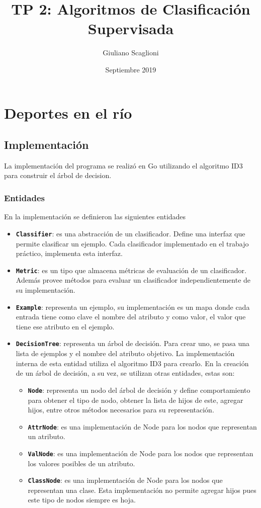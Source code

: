 \documentclass[a4paper]{article}
\title{TP 2: Algoritmos de Clasificación Supervisada}
\author{Giuliano Scaglioni}
\date{Septiembre 2019}
\newcommand{\bold}[1]{\textbf{\texttt{#1}}}
\begin{document}
\clearpage\maketitle
\thispagestyle{empty}

\newpage

\setcounter{page}{1}

\section{Deportes en el río}
  \subsection{Implementación}
  La implementación del programa se realizó en Go utilizando el algoritmo ID3 para construir el árbol de decision.

  \subsubsection{Entidades}
    En la implementación se definieron las siguientes entidades
    \begin{itemize}
      \item \bold{Classifier}: es una abstracción de un clasificador. Define una interfaz que permite clasificar un ejemplo. Cada clasificador implementado en el trabajo práctico, implementa esta interfaz.
      \item \bold{Metric}: es un tipo que almacena métricas de evaluación de un clasificador. Además provee métodos para evaluar un clasificador independientemente de su implementación.
      \item \bold{Example}: representa un ejemplo, su implementación es un mapa donde cada entrada tiene como clave el nombre del atributo y como valor, el valor que tiene ese atributo en el ejemplo.
      \item \bold{DecisionTree}: representa un árbol de decisión. Para crear uno, se pasa una lista de ejemplos y el nombre del atributo objetivo. La implementación interna de esta entidad utiliza el algoritmo ID3 para crearlo. En la creación de un árbol de decisión, a su vez, se utilizan otras entidades, estas son:
      \begin{itemize}
        \item \bold{Node}: representa un nodo del árbol de decisión y define comportamiento para obtener el tipo de nodo, obtener la lista de hijos de este, agregar hijos, entre otros métodos necesarios para su representación.
        \item \bold{AttrNode}: es una implementación de Node para los nodos que representan un atributo.
        \item \bold{ValNode}: es una implementación de Node para los nodos que representan los valores posibles de un atributo.
        \item \bold{ClassNode}: es una implementación de Node para los nodos que representan una clase. Esta implementación no permite agregar hijos pues este tipo de nodos siempre es hoja.
      \end{itemize}
    \end{itemize}
\end{document}
